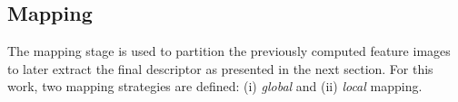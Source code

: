 \begin{table}
\caption{Number of patterns ($LBP_{\#pat}$) for different sampling points and radius ($\{P,R\}$) of the \ac{lbp} descriptor.}
\label{tab:lbphist}
\end{table}

\subsection{Mapping} \label{subsec:mapping}
The mapping stage is used to partition the previously computed feature images to later extract the final descriptor as presented in the next section.
For this work, two mapping strategies are defined: (i) \emph{global} and (ii) \emph{local} mapping.


